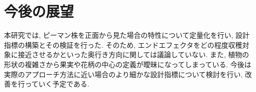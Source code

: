 \section{今後の展望}
本研究では, ピーマン株を正面から見た場合の特性について定量化を行い, 設計指標の構築とその検証を行った.
そのため, エンドエフェクタをどの程度収穫対象に接近させるかといった奥行き方向に関しては議論していない.
また, 植物の形状の複雑さから果実や花柄の中心の定義が曖昧になってしまっている.
今後は実際のアプローチ方法に近い場合のより細かな設計指標について検討を行い, 改善を行っていく予定である.